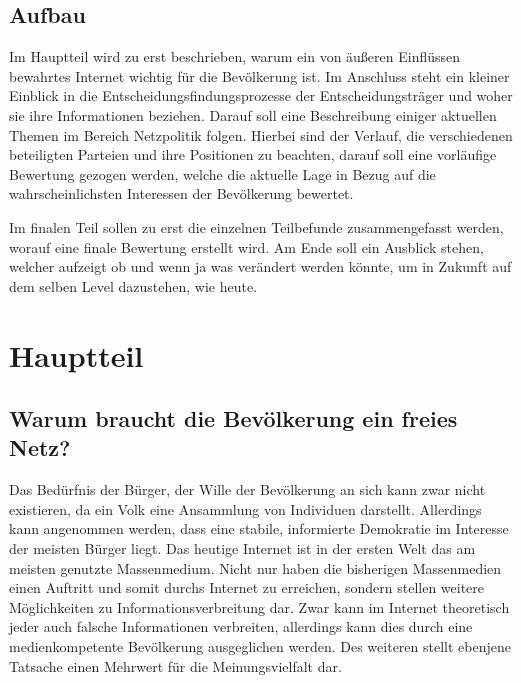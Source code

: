 \documentclass[
	12pt,
	a4paper,
	BCOR10mm,
	DIV14,
	listof=totoc,
	bibliography=totoc,
	headsepline
]{scrreprt}
\begin{document}
\section{Aufbau}
\label{structure}
Im Hauptteil wird zu erst beschrieben, warum ein von äußeren Einflüssen bewahrtes Internet wichtig für die Bevölkerung ist.
Im Anschluss steht ein kleiner Einblick in die Entscheidungsfindungsprozesse der Entscheidungsträger und woher sie ihre Informationen beziehen.
Darauf soll eine Beschreibung einiger aktuellen Themen im Bereich Netzpolitik folgen.
Hierbei sind der Verlauf, die verschiedenen beteiligten Parteien und ihre Positionen zu beachten, darauf soll eine vorläufige Bewertung gezogen werden, welche die aktuelle Lage in Bezug auf die wahrscheinlichsten Interessen der Bevölkerung bewertet. 

Im finalen Teil sollen zu erst die einzelnen Teilbefunde zusammengefasst werden, worauf eine finale Bewertung erstellt wird.
Am Ende soll ein Ausblick stehen, welcher aufzeigt ob und wenn ja was verändert werden könnte, um in Zukunft auf dem selben Level dazustehen, wie heute.


\chapter{Hauptteil}
\label{main}
\section{Warum braucht die Bevölkerung ein freies Netz?}
Das Bedürfnis der Bürger, der Wille der Bevölkerung an sich kann zwar nicht existieren, da ein Volk eine Ansammlung von Individuen darstellt.
Allerdings kann angenommen werden, dass eine stabile, informierte Demokratie im Interesse der meisten Bürger liegt. 
Das heutige Internet ist in der ersten Welt das am meisten genutzte Massenmedium.
Nicht nur haben die bisherigen Massenmedien einen Auftritt und somit durchs Internet zu erreichen, sondern stellen weitere Möglichkeiten zu Informationsverbreitung dar.
Zwar kann im Internet theoretisch jeder auch falsche Informationen verbreiten, allerdings kann dies durch eine medienkompetente Bevölkerung ausgeglichen werden.
Des weiteren stellt ebenjene Tatsache einen Mehrwert für die Meinungsvielfalt dar. 
\end{document}

